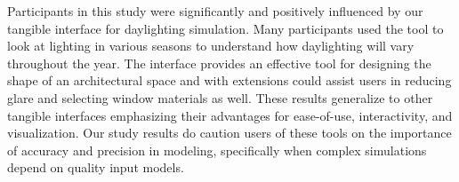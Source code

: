 \documentclass{article}
\begin{document}



Participants in this study were significantly and positively
influenced by our tangible interface for daylighting simulation.
Many participants used the tool to look at lighting in
various seasons to understand how daylighting will vary throughout the
year.  
The interface provides an effective tool for designing the shape of an
architectural space and with extensions could assist users in reducing
glare and selecting window materials as well.  These results
generalize to other tangible interfaces emphasizing their advantages
for ease-of-use, interactivity, and visualization.  Our study results
do caution users of these tools on the importance of accuracy and
precision in modeling, specifically when complex simulations depend on
quality input models.

\end{document}
